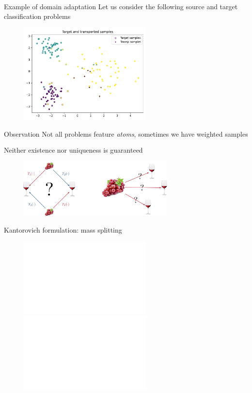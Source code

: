 \documentclass[pdf,aspectratio=169,10pt]{beamer}
\begin{document}
\begin{frame}{Example of domain adaptation}
Let us consider the following source and target classification problems
        \begin{figure}
        \includegraphics[width=0.6\textwidth]{../img/DA_samples.pdf}
    \end{figure}
\end{frame}




\begin{frame}{Observation}
Not all problems feature \emph{atoms}, sometimes we have weighted samples
\end{frame}



\begin{frame}{Neither existence nor uniqueness is guaranteed}
        \begin{figure}
        \includegraphics[width=0.7\textwidth]{../img/existence_uniqueness.pdf}
    \end{figure}
\end{frame}


\begin{frame}{Kantorovich formulation: mass splitting}

     \begin{figure}
        \includegraphics<1>[width=0.6\textwidth]{../img/wine_assignment.pdf}
        \includegraphics<2>[width=0.6\textwidth]{../img/wine_assignment_split.pdf}
    \end{figure}
\end{frame} 
\end{document}
